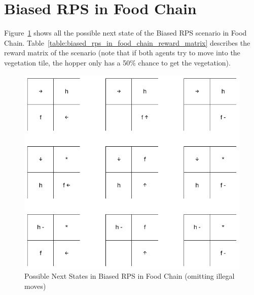 \documentclass[]{interact}
\theoremstyle{plain}%
\theoremstyle{definition}
\theoremstyle{remark}
\begin{document}



\pagebreak
\appendix

\section{Biased RPS in Food Chain}
Figure~\ref{fig:biased_rps_in_food_chain_possible_next_states} shows all the possible next state of the Biased RPS scenario in Food Chain. Table~\ref{table:biased_rps_in_food_chain_reward_matrix} describes the reward matrix of the scenario (note that if both agents try to move into the vegetation tile, the hopper only has a 50\% chance to get the vegetation).

\begin{figure}
\centering
\includegraphics{images/biased_rps_possible_next_states.png}
\caption{Possible Next States in Biased RPS in Food Chain (omitting illegal moves)}
\label{fig:biased_rps_in_food_chain_possible_next_states}
\end{figure}

\begin{table}
\label{table:biased_rps_in_food_chain_reward_matrix}
\end{table}
\end{document}
